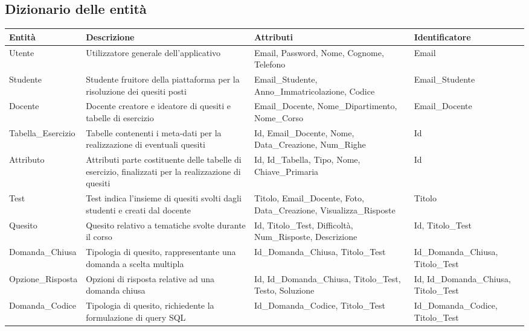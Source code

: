 \documentclass{article}
\begin{document}
\subsection{Dizionario delle entità}
\begin{table}[H]
    \centering
    \begin{tabular}{|p{3.25cm}|p{4cm}|p{4cm}|p{3.75cm}|}
        \hline
        \bf Entità & \bf Descrizione & \bf Attributi & \bf Identificatore \\
        \hline
        Utente & Utilizzatore generale dell'applicativo & Email, Password, Nome, Cognome, Telefono & Email \\        
        \hline
        Studente & Studente  fruitore della piattaforma per la risoluzione dei quesiti posti & Email\_Studente, Anno\_Immatricolazione, Codice & Email\_Studente \\
        \hline
        Docente & Docente creatore e ideatore di quesiti e tabelle di esercizio & Email\_Docente, Nome\_Dipartimento, Nome\_Corso & Email\_Docente \\
        \hline
        Tabella\_Esercizio & Tabelle contenenti i meta-dati per la realizzazione di eventuali quesiti & Id, Email\_Docente, Nome, Data\_Creazione, Num\_Righe & Id \\
        \hline
        Attributo & Attributi parte costituente delle tabelle di esercizio, finalizzati per la realizzazione di quesiti & Id, Id\_Tabella, Tipo, Nome, Chiave\_Primaria & Id \\
        \hline
        Test & Test indica l'insieme di quesiti svolti dagli studenti e creati dal docente & Titolo, Email\_Docente, Foto, Data\_Creazione, Visualizza\_Risposte & Titolo \\
        \hline
        Quesito & Quesito relativo a tematiche svolte durante il corso & Id, Titolo\_Test, Difficoltà, Num\_Risposte, Descrizione & Id, Titolo\_Test \\
        \hline
        Domanda\_Chiusa & Tipologia di quesito, rappresentante una domanda a scelta multipla & Id\_Domanda\_Chiusa, Titolo\_Test & Id\_Domanda\_Chiusa, Titolo\_Test \\
        \hline
        Opzione\_Risposta & Opzioni di risposta relative ad una domanda chiusa & Id, Id\_Domanda\_Chiusa, Titolo\_Test, Testo, Soluzione & Id, Id\_Domanda\_Chiusa, Titolo\_Test \\
        \hline
        Domanda\_Codice & Tipologia di quesito, richiedente la formulazione di query SQL & Id\_Domanda\_Codice, Titolo\_Test & Id\_Domanda\_Codice, Titolo\_Test \\

\end{tabular}
\end{table}
\end{document}
